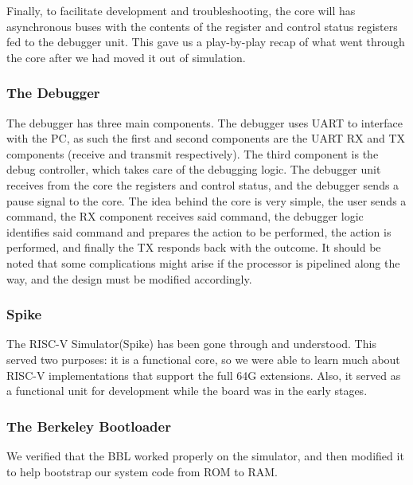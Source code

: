 \documentclass{article}
\begin{document}
    Finally, to facilitate development and troubleshooting, the core will has asynchronous buses with the contents of the register and control status registers fed to the debugger unit.  This gave us a play-by-play recap of what went through the core after we had moved it out of simulation.
    
    \subsubsection{The Debugger}
    The debugger has three main components.  The debugger uses UART to interface with the PC, as such the first and second components are the UART RX and TX components (receive and transmit respectively). The third component is the debug controller, which takes care of the debugging logic. The debugger unit receives from the core the registers and control status, and the debugger sends a pause signal to the core. The idea behind the core is very simple, the user sends a command, the RX component receives said command, the debugger logic identifies said command and prepares the action to be performed, the action is performed, and finally the TX responds back with the outcome.
    It should be noted that some complications might arise if the processor is pipelined along the way, and the design must be modified   accordingly.

    \subsubsection{Spike}
    The RISC-V Simulator(Spike) has been gone through and understood. This served two purposes: it is a functional core, so we were able to learn much about RISC-V implementations that support the full 64G extensions.  Also, it served as a functional unit for development while the board was in the early stages.
    
    \subsubsection{The Berkeley Bootloader}
    We verified that the BBL worked properly on the simulator, and then modified it to help bootstrap our system code from ROM to RAM. 
\end{document}
